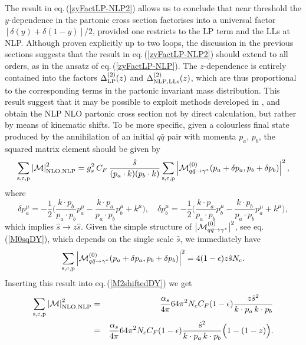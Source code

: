 \documentclass[11pt]{article}
\newcommand{\be}{\begin{equation}}
\newcommand{\ee}{\end{equation}}
\newcommand{\bea}{\begin{eqnarray}}
\newcommand{\eea}{\end{eqnarray}}
\newcommand{\nn}{\nonumber}
\newcommand{\as}{\alpha_s}
\newcommand{\eps}{\epsilon}
\newcommand{\M}{\mathcal{M}}
\newcommand\eqn[1]     {eq.\,(\ref{#1})}
\begin{document}
The result in \eqn{zyFactLP-NLP2} allows us 
to conclude that near threshold the $y$-dependence
in the partonic cross section factorises into a 
universal factor $[\delta(y)+\delta(1-y)]/2$, 
provided one restricts to the LP term and the 
LLs at NLP. Although proven explicitly up to 
two loops, the discussion in the previous 
sections suggests that the result in 
\eqn{zyFactLP-NLP2} should extend to all 
orders, as in the ansatz of \eqn{zyFactLP-NLP}. 
The $z$-dependence is entirely contained into
the factors $\Delta_{\rm LP}^{(2)}(z)$ and 
$\Delta^{(2)}_{\rm NLP,LLs}(z)$, which are 
thus proportional to the corresponding terms
in the partonic invariant mass distribution. 
This result suggest that it may be possible 
to exploit methods developed in \cite{DelDuca:2017twk},
and obtain the NLP NLO partonic cross section 
not by direct calculation, but rather by means 
of kinematic shifts. To be more specific, 
given a colourless final state produced by 
the annihilation of an initial $q\bar q$
pair with momenta $p_a$, $p_b$, the squared matrix 
element should be given by 
\be\label{M2shiftedDY}
\sum_{\rm s,c,p}\left|\M\right|^2_{\mathrm{NLO, NLP}} 
= g_s^2\, C_F\, \frac{\hat s}{(p_a\cdot k)(p_b\cdot k)}
\sum_{\rm s,c,p} \left|\M^{(0)}_{q\bar q \to \gamma^*}
(p_a+\delta p_a,p_b+\delta p_b)\right|^2,
\ee
where 
\be\label{shifted_momenta}
\delta p_a^{\mu} =
-\frac{1}{2}\bigg(\frac{k \cdot p_b}{p_a \cdot p_b} p_a^{\mu}
- \frac{k \cdot p_a}{p_a \cdot p_b} p_b^{\mu} + k^{\mu} \bigg), 
\quad 
\delta p_b^{\mu} =
-\frac{1}{2}\bigg(\frac{k \cdot p_a}{p_a \cdot p_b} p_b^{\mu}
- \frac{k \cdot p_b}{p_a \cdot p_b} p_a^{\mu} + k^{\mu} \bigg), 
\ee
which implies $\hat s \to z \hat s $. Given the simple 
structure of $\big|{\cal M}_{q\bar q \to \gamma^*}^{(0)}\big|^2$,
see \eqn{M0sqDY}, which depends on the single 
scale $\hat s$, we immediately have
\be\label{M0sqDYshifted}
\sum_{\rm s,c,p}\left|\M^{(0)}_{q\bar q \to \gamma^*}
(p_a+\delta p_a,p_b+\delta p_b)\right|^2 
= 4(1-\eps) z \hat s N_c.
\ee
Inserting this result into
\eqn{M2shiftedDY} we get
\bea\label{M2shiftedDYres} \nn
\sum_{\rm s,c,p}\left|\M\right|^2_{\mathrm{NLO, NLP}} 
&=& \frac{\as}{4\pi} 64 \pi^2 N_c C_F (1-\eps)
\frac{z \hat s^2}{k \cdot p_a\, k \cdot p_b}  \\
&=& \frac{\as}{4\pi} 64 \pi^2 N_c C_F (1-\eps)
\frac{\hat s^2}{k \cdot p_a\, k \cdot p_b} 
\Big(1 - (1-z)\Big).
\eea
\end{document}
